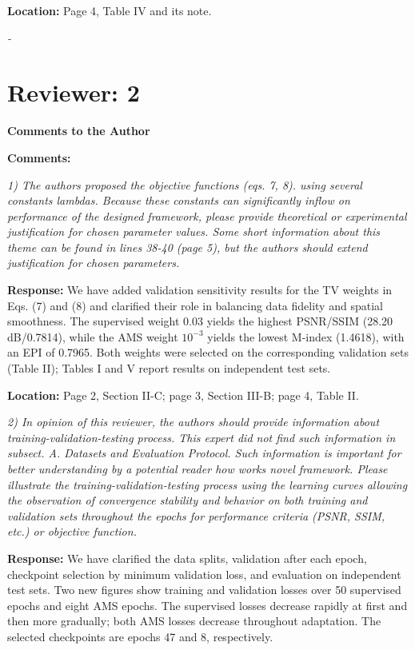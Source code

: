 \documentclass[11pt,letterpaper]{article}
\begin{document}
\textbf{Location:} Page 4, Table IV and its note.

\textit{-}

\section*{Reviewer: 2}
\textbf{Comments to the Author}\par
\textbf{Comments:}

\textit{1) The authors proposed the objective functions (eqs. 7, 8). using several constants lambdas. Because these constants can significantly inflow on performance of the designed framework, please provide theoretical or experimental justification for chosen parameter values. Some short information about this theme can be found in lines 38-40 (page 5), but the authors should extend justification for chosen parameters.}

\medskip
\textbf{Response:} We have added validation sensitivity results for the TV weights in Eqs. (7) and (8) and clarified their role in balancing data fidelity and spatial smoothness. The supervised weight 0.03 yields the highest PSNR/SSIM (28.20 dB/0.7814), while the AMS weight \(10^{-3}\) yields the lowest M-index (1.4618), with an EPI of 0.7965. Both weights were selected on the corresponding validation sets (Table II); Tables I and V report results on independent test sets.

\textbf{Location:} Page 2, Section II-C; page 3, Section III-B; page 4, Table II.

\textit{2) In opinion of this reviewer, the authors should provide information about training-validation-testing process. This expert did not find such information in subsect. A. Datasets and Evaluation Protocol. Such information is important for better understanding by a potential reader how works novel framework. Please illustrate the training-validation-testing process using the learning curves allowing the observation of convergence stability and behavior on both training and validation sets throughout the epochs for performance criteria (PSNR, SSIM, etc.) or objective function.}

\textbf{Response:} We have clarified the data splits, validation after each epoch, checkpoint selection by minimum validation loss, and evaluation on independent test sets. Two new figures show training and validation losses over 50 supervised epochs and eight AMS epochs. The supervised losses decrease rapidly at first and then more gradually; both AMS losses decrease throughout adaptation. The selected checkpoints are epochs 47 and 8, respectively.
\end{document}
